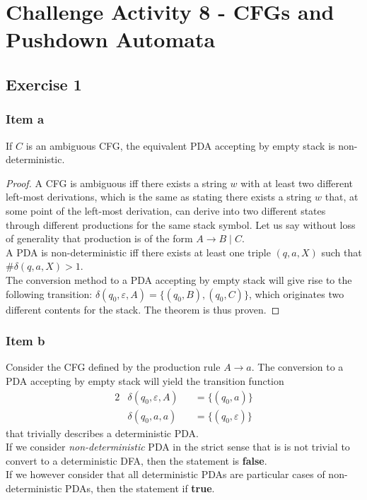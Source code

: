 \documentclass[docid=CA08]{tcom_CA}
\begin{document}
\setcounter{section}{7}
\section{Challenge Activity 8 - CFGs and Pushdown Automata}
\subsection{Exercise 1}%
{
\renewcommand{\thesubsubsection}{\thesubsection\alph{subsubsection}}
\subsubsection{Item a}
\begin{theorem}
If $C$ is an ambiguous CFG, the equivalent PDA accepting by empty stack is non-deterministic.
\end{theorem}
\begin{proof}
A CFG is ambiguous iff there exists a string $w$ with at least two different left-most derivations, which is the same as stating there exists a string $w$ that, at some point of the left-most derivation, can derive into two different states through different productions for the same stack symbol. Let us say without loss of generality that production is of the form $A \rightarrow B\mid C$.\\
A PDA is non-deterministic iff there exists at least one triple $(q,a,X)$ such that $\#\delta(q, a, X) > 1$.\\
The conversion method to a PDA accepting by empty stack will give rise to the following transition: $\delta(q_0, \varepsilon, A)=\{(q_0,B),(q_0,C)\}$, which originates two different contents for the stack. The theorem is thus proven.
\end{proof}
\subsubsection{Item b}
Consider the CFG defined by the production rule $A \rightarrow a$. The conversion to a PDA accepting by empty stack will yield the transition function
\begin{alignat*}{2}
	&\delta(q_0,\varepsilon,A) &&= \{(q_0, a)\}\\
	&\delta(q_0,a          ,a) &&= \{(q_0, \varepsilon)\} 
\end{alignat*}
that trivially describes a deterministic PDA.\\
If we consider \textit{non-deterministic} PDA in the strict sense that is is not trivial to convert to a deterministic DFA, then the statement is \textbf{false}.\\
If we however consider that all deterministic PDAs are particular cases of non-deterministic PDAs, then the statement if \textbf{true}.
}
\end{document}
